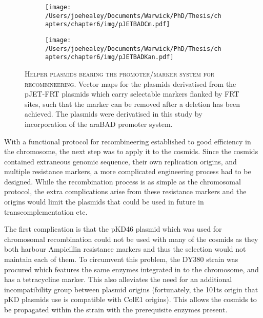 \begin{figure}[p]

\centering
  \begin{subfigure}{\textwidth}
    \texttt{[image: /Users/joehealey/Documents/Warwick/PhD/Thesis/chapters/chapter6/img/pJETBADCm.pdf]}
    \captionsetup{singlelinecheck=off, justification=centering, font=footnotesize, aboveskip=10pt}
  \end{subfigure}
  
  \begin{subfigure}{\textwidth}
    \texttt{[image: /Users/joehealey/Documents/Warwick/PhD/Thesis/chapters/chapter6/img/pJETBADKan.pdf]}
    \captionsetup{singlelinecheck=off, justification=centering, font=footnotesize, aboveskip=10pt}
  \end{subfigure}
    
    \captionsetup{singlelinecheck=off, justification=justified, font=footnotesize, aboveskip=10pt}
    \caption[Cosmid recombineering helper plasmids created]{\textsc{\normalsize Helper plasmids bearing the promoter/marker system for recombineering.} \vspace{0.1cm} \newline Vector maps for the plasmids derivatised from the pJET-FRT plasmids which carry selectable markers flanked by FRT sites, such that the marker can be removed after a deletion has been achieved. The plasmids were derivatised in this study by incorporation of the araBAD promoter system.}
\label{helpermaps}
\end{figure}


With a functional protocol for recombineering established to good efficiency in the chromosome, the next step was to apply it to the cosmids. Since the cosmids contained extraneous genomic sequence, their own replication origins, and multiple resistance markers, a more complicated engineering process had to be designed. While the recombination process is as simple as the chromosomal protocol, the extra complications arise from these resistance markers and the origins would limit the plasmids that could be used in future in transcomplementation etc.

The first complication is that the pKD46 plasmid which was used for chromosomal recombination could not be used with many of the cosmids as they both harbour Ampicillin resistance markers and thus the selection would not maintain each of them. To circumvent this problem, the DY380 strain was procured which features the same enzymes integrated in to the chromosome, and has a tetracycline marker. This also alleviates the need for an additional incompatibility group between plasmid origins (fortunately, the 101ts origin that pKD plasmids use is compatible with ColE1 origins). This allows the cosmids to be propagated within the strain with the prerequisite enzymes present.

